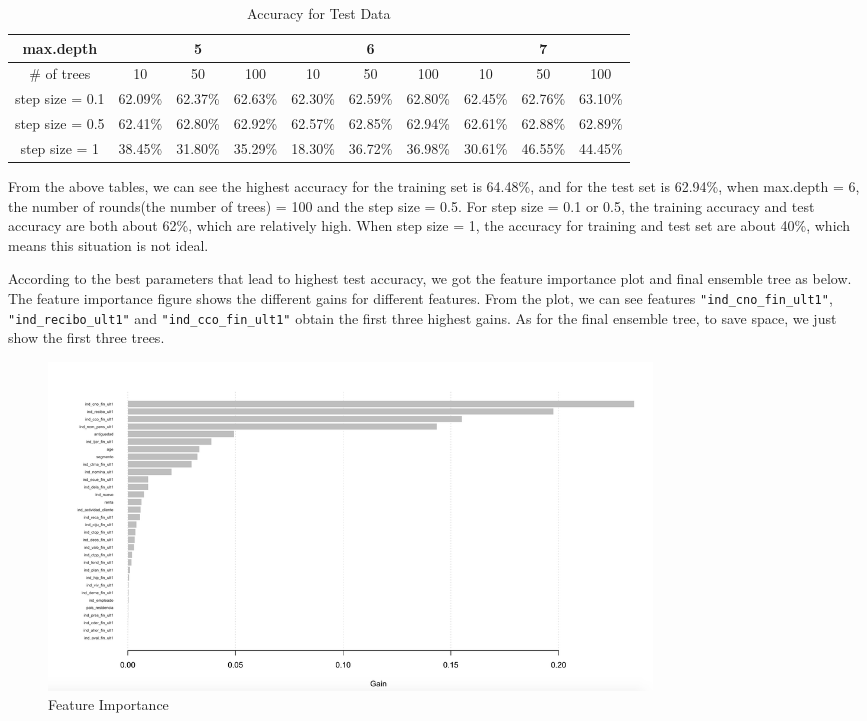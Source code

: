 \documentclass{article}
\begin{document}
\begin{spacing}{1.5}
\begin{large}
\begin{table}[h]
\centering
\caption{Accuracy for Test Data}
\label{Accuracy for Test Data}
\begin{tabular}{cccccccccc}
\hline
max.depth       & \multicolumn{3}{c}{5} & \multicolumn{3}{c}{6} & \multicolumn{3}{c}{7} \\ \hline
\# of trees     & 10    & 50    & 100   & 10  & 50       & 100  & 10    & 50    & 100   \\
step size = 0.1 & 62.09\%      & 62.37\%     & 62.63\%      &62.30\%     & 62.59\%       & 62.80\%      & 62.45\%      & 62.76\%      & 63.10\%      \\
step size = 0.5 & 62.41\%     & 62.80\%     & 62.92\%      & 62.57\%    &62.85\%     & 62.94\%   & 62.61\%      & 62.88\%      & 62.89\%      \\
step size = 1   &38.45\%       & 31.80\%      & 35.29\%      &18.30\%     & 36.72\%         &  36.98\% &30.61\%       &46.55\%      &44.45\%     \\ \hline
\end{tabular}
\end{table}

\noindent \indent From the above tables, we can see the highest accuracy for the training set is 64.48\%, and for the test set is 62.94\%, when max.depth = 6, the number of rounds(the number of trees) = 100 and the step size = 0.5. For step size = 0.1 or 0.5, the training accuracy and test accuracy are both about 62\%, which are relatively high. When step size = 1, the accuracy for training and test set are about 40\%, which means this situation is not ideal.

\noindent \indent According to the best parameters that lead to highest test accuracy, we got the feature importance plot and final ensemble tree as below. The feature importance figure shows the different gains for different features. From the plot, we can see features \verb|"ind_cno_fin_ult1"|, \verb|"ind_recibo_ult1"| and \verb|"ind_cco_fin_ult1"| obtain the first three highest gains. As for the final ensemble tree, to save space, we just show the first three trees.

\begin{figure}[H]
\centering
\includegraphics[width = 160mm]{113.png}
\caption{Feature Importance}
\end{figure}


\end{large}
\end{spacing}
\end{document}
